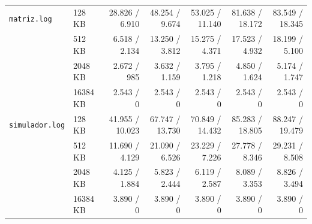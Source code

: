 \documentclass[12pt,a4paper]{article}
\begin{document}
\begin{table}[H]
{\begin{tabular}{llrrrrr}
\midrule
\texttt{matriz.log}     & 128 KB   & 28.826 / 6.910  & 48.254 / 9.674  & 53.025 / 11.140 & 81.638 / 18.172 & 83.549 / 18.345  \\
                        & 512 KB   & 6.518 / 2.134   & 13.250 / 3.812  & 15.275 / 4.371  & 17.523 / 4.932  & 18.199 / 5.100   \\
                        & 2048 KB  & 2.672 / 985     & 3.632 / 1.159   & 3.795 / 1.218   & 4.850 / 1.624   & 5.174 / 1.747    \\
                        & 16384 KB & 2.543 / 0       & 2.543 / 0       & 2.543 / 0       & 2.543 / 0       & 2.543 / 0        \\
\midrule
\texttt{simulador.log}  & 128 KB   & 41.955 / 10.023 & 67.747 / 13.730 & 70.849 / 14.432 & 85.283 / 18.805 & 88.247 / 19.479  \\
                        & 512 KB   & 11.690 / 4.129  & 21.090 / 6.526  & 23.229 / 7.226  & 27.778 / 8.346  & 29.231 / 8.508   \\
                        & 2048 KB  & 4.125 / 1.884   & 5.823 / 2.444   & 6.119 / 2.587   & 8.089 / 3.353   & 8.826 / 3.494    \\
                        & 16384 KB & 3.890 / 0       & 3.890 / 0       & 3.890 / 0       & 3.890 / 0       & 3.890 / 0        \\
\bottomrule
\end{tabular}%
}
\end{table}
\end{document}
